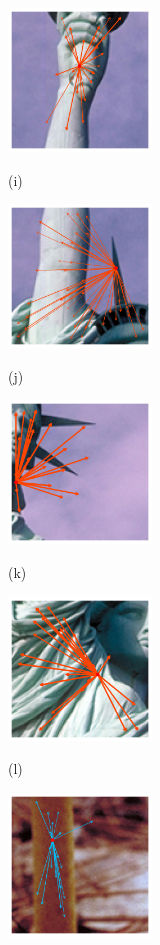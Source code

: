 \begin{figure}[]
\begin{minipage}[t]{.24\linewidth}
			\includegraphics[width=1.5in]{cropped/lady_superpixel_1.jpg}
			\centerline{(i)}
			\label{LADY-1}
		\end{minipage}
		\begin{minipage}[t]{.24\linewidth}
			\includegraphics[width=1.5in]{cropped/lady_superpixel_5.jpg}
			\centerline{(j)}
			\label{LADY-2}
		\end{minipage}
		\begin{minipage}[t]{.24\linewidth}
			\includegraphics[width=1.5in]{cropped/lady_superpixel_10.jpg}
			\centerline{(k)}
			\label{LADY-3}
		\end{minipage}
		\begin{minipage}[t]{.24\linewidth}
			\includegraphics[width=1.5in]{cropped/lady_superpixel_9.jpg}
			\centerline{(l)}
			\label{LADY-4}
		\end{minipage}
		\begin{minipage}[t]{.24\linewidth}
			\includegraphics[width=1.5in]{cropped/shroom_superpixel_9.jpg}

\end{minipage}
\end{figure}
